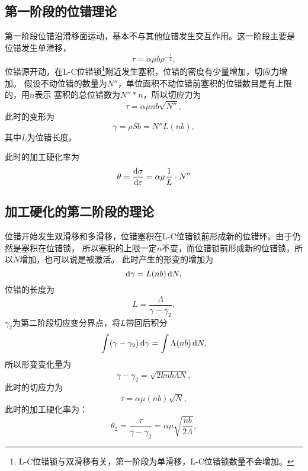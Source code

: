         \subsection{第一阶段的位错理论}
        第一阶段位错沿滑移面运动，基本不与其他位错发生交互作用。这一阶段主要是
        位错发生单滑移，
        \begin{equation}
            \tau=\alpha\mu b\rho^{-\frac{1}{2}},
        \end{equation}
        位错源开动，在L-C位错锁\footnote{L-C位错锁与双滑移有关，第一阶段为单滑移，L-C位错锁数量不会增加。}附近发生塞积，位错的密度有少量增加，切应力增加。
        假设不动位错的数量为$N''$，单位面积不动位错前塞积的位错数目是有上限的，用$n$表示
        塞积的总位错数为$N''*n$，所以切应力为
        \begin{equation}
            \tau=\alpha\mu nb\sqrt{N''},
        \end{equation}
        此时的变形为
        \begin{equation}
            \gamma=\rho Sb=N''L(nb),
        \end{equation}
        其中$L$为位错长度。
        
        此时的加工硬化率为
        \begin{equation}
            \theta=\frac{\mathop{}\!\mathrm{d}\sigma}{\mathop{}\!\mathrm{d} \varepsilon}=\alpha\mu\frac{1}{L}\cdot N''
        \end{equation}

        \subsection{加工硬化的第二阶段的理论}
            位错开始发生双滑移和多滑移，位错塞积在L-C位错锁前形成新的位错环。由于仍然是塞积在位错锁，
            所以塞积的上限一定$n$不变，而位错锁前形成新的位错锁，所以$N$增加，也可以说是被激活。
            此时产生的形变的增加为
            \begin{equation}
                \mathop{}\!\mathrm{d} \gamma=L(nb)\mathop{}\!\mathrm{d} N,
            \end{equation}
            位错的长度为
            \begin{equation}
                L=\frac{\Lambda}{\gamma-\gamma_2},
            \end{equation}
            $\gamma_2$为第二阶段切应变分界点，将$L$带回后积分
            \begin{equation}
                \int(\gamma-\gamma_2)\mathop{}\!\mathrm{d}\gamma=\int\Lambda(nb)\mathop{}\!\mathrm{d} N,
            \end{equation}
            所以形变变化量为
            \begin{equation}
                \gamma-\gamma_2=\sqrt{2knb\Lambda N},
            \end{equation}
            此时的切应力为
            \begin{equation}
                \tau=\alpha\mu(nb)\sqrt{N},
            \end{equation}
            此时的加工硬化率为：
            \begin{equation}
                \theta_2=\frac{\tau}{\gamma-\gamma_2}=\alpha\mu\sqrt{\frac{nb}{2\Lambda}},
            \end{equation}
            
